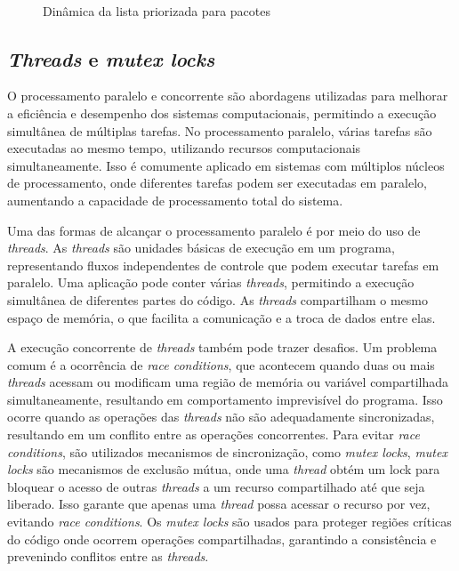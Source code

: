 \begin{figure}[ht]
	\centering
	\caption{Dinâmica da lista priorizada para pacotes}
	\\
	\label{fig:prio}
\end{figure}

\subsection{\textit{Threads} e \textit{mutex locks}}

O processamento paralelo e concorrente são abordagens utilizadas para melhorar a eficiência e desempenho dos sistemas computacionais, permitindo a execução simultânea de múltiplas tarefas. No processamento paralelo, várias tarefas são executadas ao mesmo tempo, utilizando recursos computacionais simultaneamente. Isso é comumente aplicado em sistemas com múltiplos núcleos de processamento, onde diferentes tarefas podem ser executadas em paralelo, aumentando a capacidade de processamento total do sistema.

Uma das formas de alcançar o processamento paralelo é por meio do uso de \textit{threads}. As \textit{threads} são unidades básicas de execução em um programa, representando fluxos independentes de controle que podem executar tarefas em paralelo. Uma aplicação pode conter várias \textit{threads}, permitindo a execução simultânea de diferentes partes do código. As \textit{threads} compartilham o mesmo espaço de memória, o que facilita a comunicação e a troca de dados entre elas.

A execução concorrente de \textit{threads} também pode trazer desafios. Um problema comum é a ocorrência de \textit{race conditions}, que acontecem quando duas ou mais \textit{threads} acessam ou modificam uma região de memória ou variável compartilhada simultaneamente, resultando em comportamento imprevisível do programa. Isso ocorre quando as operações das \textit{threads} não são adequadamente sincronizadas, resultando em um conflito entre as operações concorrentes. Para evitar \textit{race conditions}, são utilizados mecanismos de sincronização, como \textit{mutex locks}, \textit{mutex locks} são mecanismos de exclusão mútua, onde uma \textit{thread} obtém um lock para bloquear o acesso de outras \textit{threads} a um recurso compartilhado até que seja liberado. Isso garante que apenas uma \textit{thread} possa acessar o recurso por vez, evitando \textit{race conditions}. Os \textit{mutex locks} são usados para proteger regiões críticas do código onde ocorrem operações compartilhadas, garantindo a consistência e prevenindo conflitos entre as \textit{threads}.

